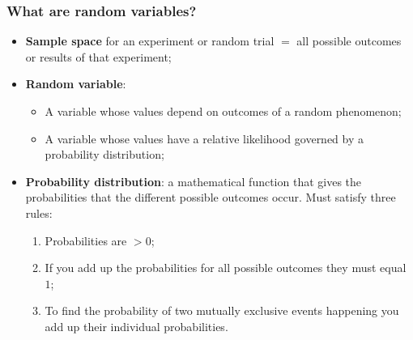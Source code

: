 \documentclass[aspectratio=169]{beamer}
\theoremstyle{principle}
\begin{document}
\begin{frame}
\frametitle{What are random variables?}

\begin{itemize}
\item \textbf{Sample space} for an experiment or random trial $=$ all possible outcomes or results of that experiment;
\bigskip
\bigskip

\item \textbf{Random variable}:
\begin{itemize}
\item A variable whose values depend on outcomes of a random phenomenon;
\item A variable whose values have a relative likelihood governed by a probability distribution;
\end{itemize}
\bigskip

\item \textbf{Probability distribution}: a mathematical function that gives the probabilities that the different possible outcomes occur.  Must satisfy three rules:
\begin{enumerate}
\item Probabilities are $>0$;
\item If you add up the probabilities for all possible outcomes they must equal $1$;
\item To find the probability of two mutually exclusive events happening you add up their individual probabilities.
\end{enumerate}

\end{itemize}

\end{frame}
\end{document}
